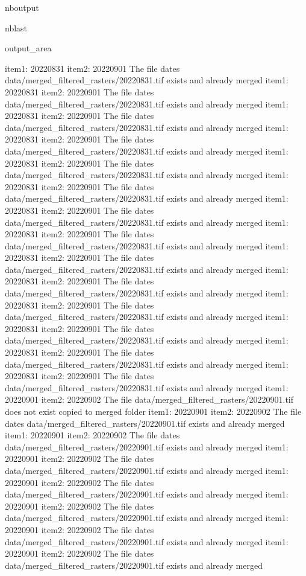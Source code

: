 \documentclass[letterpaper,10pt]{sphinxmanual}
\begin{document}
\begin{sphinxuseclass}{nboutput}
\begin{sphinxuseclass}{nblast}
{\begin{sphinxuseclass}{output_area}
\begin{sphinxuseclass}{}
\begin{sphinxVerbatim}[commandchars=\\\{\}]
item1:  20220831
item2:  20220901
The file dates data/merged\_filtered\_rasters/20220831.tif exists and already merged
item1:  20220831
item2:  20220901
The file dates data/merged\_filtered\_rasters/20220831.tif exists and already merged
item1:  20220831
item2:  20220901
The file dates data/merged\_filtered\_rasters/20220831.tif exists and already merged
item1:  20220831
item2:  20220901
The file dates data/merged\_filtered\_rasters/20220831.tif exists and already merged
item1:  20220831
item2:  20220901
The file dates data/merged\_filtered\_rasters/20220831.tif exists and already merged
item1:  20220831
item2:  20220901
The file dates data/merged\_filtered\_rasters/20220831.tif exists and already merged
item1:  20220831
item2:  20220901
The file dates data/merged\_filtered\_rasters/20220831.tif exists and already merged
item1:  20220831
item2:  20220901
The file dates data/merged\_filtered\_rasters/20220831.tif exists and already merged
item1:  20220831
item2:  20220901
The file dates data/merged\_filtered\_rasters/20220831.tif exists and already merged
item1:  20220831
item2:  20220901
The file dates data/merged\_filtered\_rasters/20220831.tif exists and already merged
item1:  20220831
item2:  20220901
The file dates data/merged\_filtered\_rasters/20220831.tif exists and already merged
item1:  20220831
item2:  20220901
The file dates data/merged\_filtered\_rasters/20220831.tif exists and already merged
item1:  20220831
item2:  20220901
The file dates data/merged\_filtered\_rasters/20220831.tif exists and already merged
item1:  20220831
item2:  20220901
The file dates data/merged\_filtered\_rasters/20220831.tif exists and already merged
item1:  20220901
item2:  20220902
The file data/merged\_filtered\_rasters/20220901.tif does not exist copied to merged folder
item1:  20220901
item2:  20220902
The file dates data/merged\_filtered\_rasters/20220901.tif exists and already merged
item1:  20220901
item2:  20220902
The file dates data/merged\_filtered\_rasters/20220901.tif exists and already merged
item1:  20220901
item2:  20220902
The file dates data/merged\_filtered\_rasters/20220901.tif exists and already merged
item1:  20220901
item2:  20220902
The file dates data/merged\_filtered\_rasters/20220901.tif exists and already merged
item1:  20220901
item2:  20220902
The file dates data/merged\_filtered\_rasters/20220901.tif exists and already merged
item1:  20220901
item2:  20220902
The file dates data/merged\_filtered\_rasters/20220901.tif exists and already merged
item1:  20220901
item2:  20220902
The file dates data/merged\_filtered\_rasters/20220901.tif exists and already merged

\end{sphinxVerbatim}
\end{sphinxuseclass}
\end{sphinxuseclass}}
\end{sphinxuseclass}
\end{sphinxuseclass}
\end{document}
